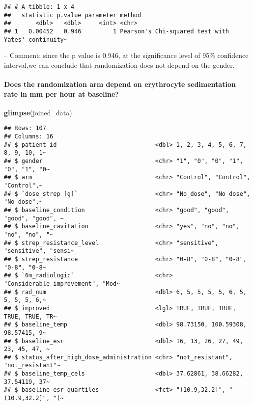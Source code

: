 \documentclass[
]{article}
\newenvironment{Shaded}{\begin{snugshade}}{\end{snugshade}}
\newcommand{\FunctionTok}[1]{\textcolor[rgb]{0.13,0.29,0.53}{\textbf{#1}}}
\newcommand{\NormalTok}[1]{#1}
\begin{document}
\begin{verbatim}
## # A tibble: 1 x 4
##   statistic p.value parameter method                                            
##       <dbl>   <dbl>     <int> <chr>                                             
## 1   0.00452   0.946         1 Pearson's Chi-squared test with Yates' continuity~
\end{verbatim}

-- Comment: since the p value is 0.946, at the significance level of
95\% confidence interval,we can conclude that randomization does not
depend on the gender.

\paragraph{Does the randomization arm depend on erythrocyte
sedimentation rate in mm per hour at
baseline?}\label{does-the-randomization-arm-depend-on-erythrocyte-sedimentation-rate-in-mm-per-hour-at-baseline}

\begin{Shaded}
\begin{Highlighting}[]
\FunctionTok{glimpse}\NormalTok{(joined\_data)}
\end{Highlighting}
\end{Shaded}

\begin{verbatim}
## Rows: 107
## Columns: 16
## $ patient_id                            <dbl> 1, 2, 3, 4, 5, 6, 7, 8, 9, 10, 1~
## $ gender                                <chr> "1", "0", "0", "1", "0", "1", "0~
## $ arm                                   <chr> "Control", "Control", "Control",~
## $ `dose_strep [g]`                      <chr> "No_dose", "No_dose", "No_dose",~
## $ baseline_condition                    <chr> "good", "good", "good", "good", ~
## $ baseline_cavitation                   <chr> "yes", "no", "no", "no", "no", "~
## $ strep_resistance_level                <chr> "sensitive", "sensitive", "sensi~
## $ strep_resistance                      <chr> "0-8", "0-8", "0-8", "0-8", "0-8~
## $ `6m_radiologic`                       <chr> "Considerable_improvement", "Mod~
## $ rad_num                               <dbl> 6, 5, 5, 5, 5, 6, 5, 5, 5, 5, 6,~
## $ improved                              <lgl> TRUE, TRUE, TRUE, TRUE, TRUE, TR~
## $ baseline_temp                         <dbl> 98.73150, 100.59308, 98.57415, 9~
## $ baseline_esr                          <dbl> 16, 13, 26, 27, 49, 23, 45, 47, ~
## $ status_after_high_dose_administration <chr> "not_resistant", "not_resistant"~
## $ baseline_temp_cels                    <dbl> 37.62861, 38.66282, 37.54119, 37~
## $ baseline_esr_quartiles                <fct> "(10.9,32.2]", "(10.9,32.2]", "(~
\end{verbatim}
\end{document}

